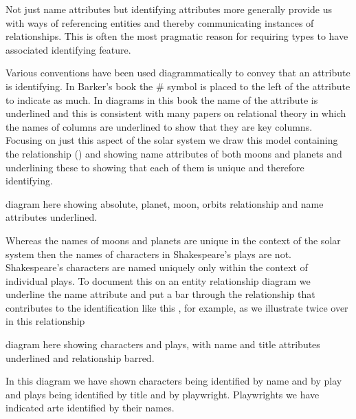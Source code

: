 \mynote
 Not just name attributes but identifying attributes more generally provide us with ways of 
 referencing entities and thereby communicating instances of relationships. 
 This is often the most pragmatic reason for requiring types to have associated identifying feature. 

 \mynote
Various conventions have been used diagrammatically to convey that an attribute is identifying. In Barker's book the \# symbol is placed to the left of the attribute to indicate as much. In diagrams in this book the name of the attribute is underlined and this is consistent with many papers on relational theory in which  the names of columns are underlined to show that they are key columns. 
\mynote
Focusing on just this aspect of the solar system we  draw this model containing the relationship () and showing name attributes of both moons and planets and
underlining these to showing that each of them is unique and therefore identifying. 
\begin{noteforfuture}
diagram here showing absolute, planet, moon, orbits relationship and 
name attributes underlined. 
\end{noteforfuture}

\mynote
Whereas the names of moons and planets are unique in the context of the solar system then the names of characters in Shakespeare's plays are not. Shakespeare's characters are named uniquely only within the context of individual plays. To document this on an entity relationship diagram we underline the name attribute and put a bar through the relationship that contributes to the identification like this \barkerEllisJ, for example, as we illustrate twice over in this relationship

\begin{noteforfuture}
diagram here showing characters and plays, with name and title 
attributes underlined and relationship barred.
\end{noteforfuture}
In this diagram we have shown characters being identified by name and by play 
and plays being identified by title and by playwright. Playwrights we have indicated arte identified by their names.

